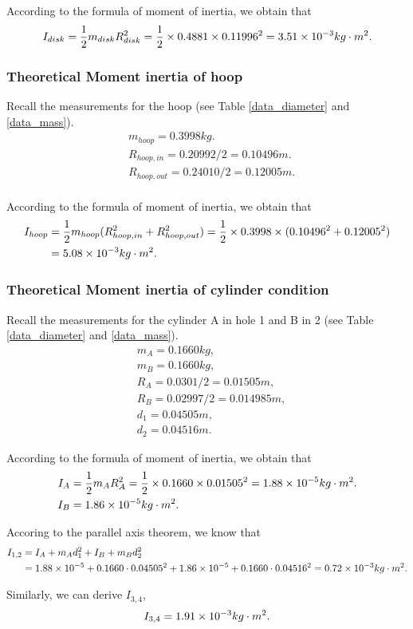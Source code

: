     According to the formula of moment of inertia, we obtain that
    \[
        I_{disk}=\frac{1}{2}m_{disk}R_{disk}^2=\frac{1}{2}\times 0.4881\times 0.11996^2=3.51\times10^{-3}kg\cdot m^2.
    \]

\subsubsection{Theoretical Moment inertia of hoop}
    Recall the measurements for the hoop (see Table \ref{data_diameter} and \ref{data_mass}).
    \[
    \begin{split}
        &m_{hoop}=0.3998kg.\\
        &R_{hoop,in}=0.20992/2=0.10496m.\\
        &R_{hoop,out}=0.24010/2=0.12005m.\\               
    \end{split}
    \]

    According to the formula of moment of inertia, we obtain that
    \[
    \begin{split}
        I_{hoop}&=\frac{1}{2}m_{hoop}(R_{hoop,in}^2+R_{hoop,out}^2)=\frac{1}{2}\times 0.3998\times (0.10496^2+0.12005^2)\\
        &=5.08\times10^{-3}kg\cdot m^2.
    \end{split}
    \]

\subsubsection{Theoretical Moment inertia of cylinder condition}
    Recall the measurements for the cylinder A in hole 1 and B in 2 (see Table \ref{data_diameter} and \ref{data_mass}).
    \[
    \begin{split}
        &m_{A}=0.1660kg,\\
        &m_{B}=0.1660kg,\\
        &R_{A}=0.0301/2=0.01505m,\\
        &R_{B}=0.02997/2=0.014985m,\\
        &d_1=0.04505m,\\
        &d_2=0.04516m.
    \end{split}
    \]

    According to the formula of moment of inertia, we obtain that
    \[
    \begin{split}
        I_{A}&=\frac{1}{2}m_{A}R_{A}^2=\frac{1}{2}\times 0.1660\times 0.01505^2=1.88\times10^{-5}kg\cdot m^2.\\
        I_{B}&=1.86\times10^{-5}kg\cdot m^2.\\
    \end{split}
    \]

    Accoring to the parallel axis theorem, we know that
    \[
    \begin{split}
        I_{1,2}&=I_A+m_A d_1^2+I_B+m_B d_2^2\\
        &=1.88\times10^{-5}+0.1660\cdot 0.04505^2+1.86\times10^{-5}+0.1660\cdot 0.04516^2=0.72\times10^{-3}kg\cdot m^2.
    \end{split}
    \]

    Similarly, we can derive $I_{3,4}$,
    \[
        I_{3,4}=1.91\times10^{-3}kg\cdot m^2.
    \]